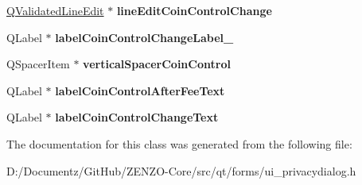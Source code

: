 \begin{DoxyCompactItemize}
\item 
\mbox{\label{class_ui___privacy_dialog_ad4d6f57f0656e08b4da5e0df542df254}} 
\mbox{\hyperlink{class_q_validated_line_edit}{Q\+Validated\+Line\+Edit}} $\ast$ {\bfseries line\+Edit\+Coin\+Control\+Change}
\item 
\mbox{\label{class_ui___privacy_dialog_ae2e1c2b0478c0deb206b658122f30db3}} 
Q\+Label $\ast$ {\bfseries label\+Coin\+Control\+Change\+Label\+\_}
\item 
\mbox{\label{class_ui___privacy_dialog_af98b1d614ac51b02167aed5112e38126}} 
Q\+Spacer\+Item $\ast$ {\bfseries vertical\+Spacer\+Coin\+Control}
\item 
\mbox{\label{class_ui___privacy_dialog_afec28e616a1fd4c51e7624b1a33281fb}} 
Q\+Label $\ast$ {\bfseries label\+Coin\+Control\+After\+Fee\+Text}
\item 
\mbox{\label{class_ui___privacy_dialog_ac2a17069bf421a295272a74babbf5cda}} 
Q\+Label $\ast$ {\bfseries label\+Coin\+Control\+Change\+Text}
\end{DoxyCompactItemize}


The documentation for this class was generated from the following file\+:\begin{DoxyCompactItemize}
\item 
D\+:/\+Documentz/\+Git\+Hub/\+Z\+E\+N\+Z\+O-\/\+Core/src/qt/forms/ui\+\_\+privacydialog.\+h\end{DoxyCompactItemize}
